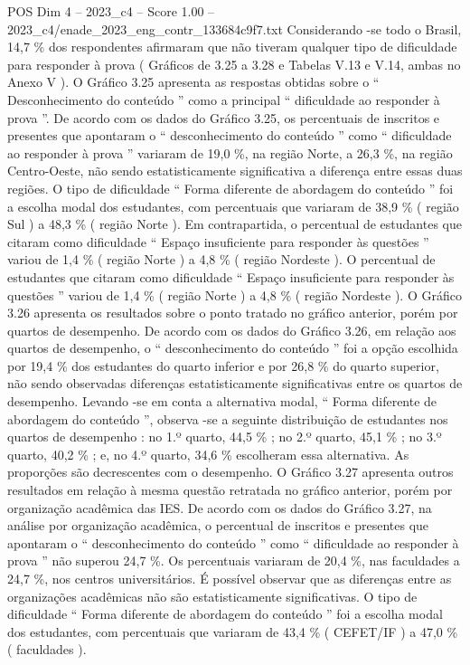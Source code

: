\begin{textsample}{POS Dim 4 – 2023\_c4 – Score 1.00 – 2023\_c4/enade\_2023\_eng\_contr\_133684c9f7.txt}
Considerando -se todo o Brasil, 14,7 \% dos respondentes afirmaram que não tiveram qualquer tipo de dificuldade para responder à prova ( Gráficos de 3.25 a 3.28 e Tabelas V.13 e V.14, ambas no Anexo V ).
O Gráfico 3.25 apresenta as respostas obtidas sobre o “ Desconhecimento do conteúdo ” como a principal “ dificuldade ao responder à prova ”.
De acordo com os dados do Gráfico 3.25, os percentuais de inscritos e presentes que apontaram o “ desconhecimento do conteúdo ” como “ dificuldade ao responder à prova ” variaram de 19,0 \%, na região Norte, a 26,3 \%, na região Centro-Oeste, não sendo estatisticamente significativa a diferença entre essas duas regiões.
O tipo de dificuldade “ Forma diferente de abordagem do conteúdo ” foi a escolha modal dos estudantes, com percentuais que variaram de 38,9 \% ( região Sul ) a 48,3 \% ( região Norte ).
Em contrapartida, o percentual de estudantes que citaram como dificuldade “ Espaço insuficiente para responder às questões ” variou de 1,4 \% ( região Norte ) a 4,8 \% ( região Nordeste ).
O percentual de estudantes que citaram como dificuldade “ Espaço insuficiente para responder às questões ” variou de 1,4 \% ( região Norte ) a 4,8 \% ( região Nordeste ).
O Gráfico 3.26 apresenta os resultados sobre o ponto tratado no gráfico anterior, porém por quartos de desempenho.
De acordo com os dados do Gráfico 3.26, em relação aos quartos de desempenho, o “ desconhecimento do conteúdo ” foi a opção escolhida por 19,4 \% dos estudantes do quarto inferior e por 26,8 \% do quarto superior, não sendo observadas diferenças estatisticamente significativas entre os quartos de desempenho.
Levando -se em conta a alternativa modal, “ Forma diferente de abordagem do conteúdo ”, observa -se a seguinte distribuição de estudantes nos quartos de desempenho : no 1.º quarto, 44,5 \% ; no 2.º quarto, 45,1 \% ; no 3.º quarto, 40,2 \% ; e, no 4.º quarto, 34,6 \% escolheram essa alternativa.
As proporções são decrescentes com o desempenho.
O Gráfico 3.27 apresenta outros resultados em relação à mesma questão retratada no gráfico anterior, porém por organização acadêmica das IES.
De acordo com os dados do Gráfico 3.27, na análise por organização acadêmica, o percentual de inscritos e presentes que apontaram o “ desconhecimento do conteúdo ” como “ dificuldade ao responder à prova ” não superou 24,7 \%.
Os percentuais variaram de 20,4 \%, nas faculdades a 24,7 \%, nos centros universitários.
É possível observar que as diferenças entre as organizações acadêmicas não são estatisticamente significativas.
O tipo de dificuldade “ Forma diferente de abordagem do conteúdo ” foi a escolha modal dos estudantes, com percentuais que variaram de 43,4 \% ( CEFET/IF ) a 47,0 \% ( faculdades ).

\end{textsample}
